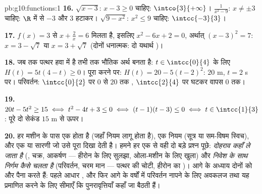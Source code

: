 \begin{solution}{pb:g10:functions:1}
\textbf{16.} $\sqrt{x - 3}$: $x - 3 \geq 0$ चाहिए: $\intco{3}{+\infty}$। $\frac{1}{x^2 - 9}$: $x \neq \pm 3$ चाहिए: $\R$ में से
$-3$ और $3$ हटाकर। $\sqrt{9 - x^2}$: $x^2 \leq 9$ चाहिए: $\intcc{-3}{3}$।

\textbf{17.} $f(x) = 3$ से $x + \frac2x = 6$ मिलता है, इसलिए $x^2 - 6x + 2 = 0$, अर्थात् $(x - 3)^2 = 7$: $x = 3 - \sqrt7$ या
$x = 3 + \sqrt7$ (दोनों धनात्मक: दो यथार्थ )।

\textbf{18.} जब तक पत्थर हवा में है तभी तक भौतिक अर्थ बनता है: $t \in \intcc{0}{4}$ के लिए
$H(t) = 5t(4 - t) \geq 0$। पूरा करने पर: $H(t) = 20 - 5(t - 2)^2$:  $20$ m, $t = 2$ s पर। परिवर्तन: $\intcc{0}{2}$ पर
$0$ से $20$ तक , $\intcc{2}{4}$ पर घटकर वापस $0$ तक।

\textbf{19.} $20t - 5t^2 \geq 15 \iff t^2 - 4t + 3 \leq 0 \iff
(t - 1)(t - 3) \leq 0 \iff t \in \intcc{1}{3}$: पूरे दो सेकंड $15$ m से ऊपर।

\textbf{20.} हर मशीन के पास एक  होता है (जहाँ नियम लागू होता है), एक
नियम (सूत्र या सम-विषम स्विच), और एक  या सारणी जो उसे पूरा दिखा देती है।
हमने हर एक से वही दो बड़े प्रश्न पूछे: \emph{दोहराव कहाँ ले जाता है} (, चक्र, आकर्षण --- हीरोन के लिए सुलझा, ओला-मशीन के लिए खुला) और
\emph{निवेश के साथ निर्गम कैसे चलता है} (परिवर्तन, चरम मान --- पत्थर की
चोटी, हीरोन का )। आगे के अध्याय दोनों को और पैना करते हैं: पहले आधार
, और फिर आगे के वर्षों में परिवर्तन नापने के लिए अवकलज तथा यह प्रमाणित
करने के लिए सीमाएँ कि पुनरावृत्तियाँ कहाँ जा बैठती हैं।
\end{solution}
